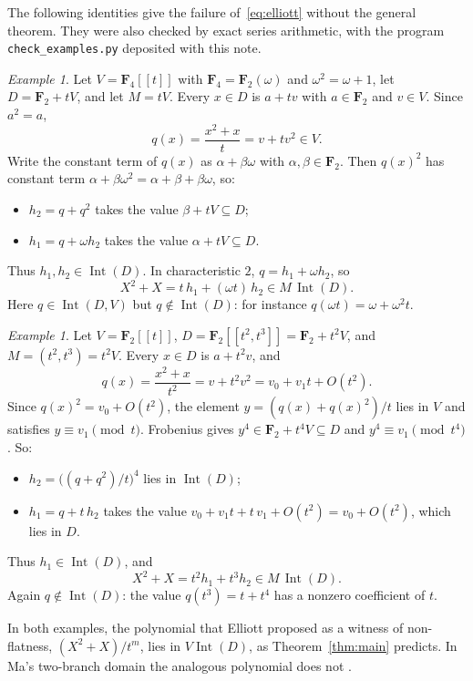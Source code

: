 \documentclass[11pt,a4paper]{article}
\theoremstyle{plain}
\theoremstyle{remark}
\newtheorem{example}[theorem]{Example}
\newcommand{\F}{\mathbf F}
\newcommand{\Int}{\operatorname{Int}}
\begin{document}
The following identities give the failure of~\eqref{eq:elliott} without the general theorem. They were also checked
by exact series arithmetic, with the program \texttt{check\_examples.py} deposited with this note.

\begin{example}\label{ex:f4}
Let $V=\F_4[[t]]$ with $\F_4=\F_2(\omega)$ and $\omega^2=\omega+1$, let $D=\F_2+tV$, and let $M=tV$. Every $x\in D$
is $a+tv$ with $a\in\F_2$ and $v\in V$. Since $a^2=a$,
\[
 q(x)=\frac{x^2+x}{t}=v+tv^2\in V .
\]
Write the constant term of $q(x)$ as $\alpha+\beta\omega$ with $\alpha,\beta\in\F_2$. Then $q(x)^2$ has constant term
$\alpha+\beta\omega^2=\alpha+\beta+\beta\omega$, so:
\begin{itemize}
\item $h_2=q+q^2$ takes the value $\beta+tV\subseteq D$;
\item $h_1=q+\omega h_2$ takes the value $\alpha+tV\subseteq D$.
\end{itemize}
Thus $h_1,h_2\in\Int(D)$. In characteristic $2$, $q=h_1+\omega h_2$, so
\[
 X^2+X=t\,h_1+(\omega t)\,h_2\in M\,\Int(D).
\]
Here $q\in\Int(D,V)$ but $q\notin\Int(D)$: for instance $q(\omega t)=\omega+\omega^2t$.
\end{example}

\begin{example}\label{ex:cusp}
Let $V=\F_2[[t]]$, $D=\F_2[[t^2,t^3]]=\F_2+t^2V$, and $M=(t^2,t^3)=t^2V$. Every $x\in D$ is $a+t^2v$, and
\[
 q(x)=\frac{x^2+x}{t^2}=v+t^2v^2=v_0+v_1t+O(t^2).
\]
Since $q(x)^2=v_0+O(t^2)$, the element $y=(q(x)+q(x)^2)/t$ lies in $V$ and satisfies $y\equiv v_1\pmod t$. Frobenius
gives $y^4\in\F_2+t^4V\subseteq D$ and $y^4\equiv v_1\pmod{t^4}$. So:
\begin{itemize}
\item $h_2=\bigl((q+q^2)/t\bigr)^4$ lies in $\Int(D)$;
\item $h_1=q+t\,h_2$ takes the value $v_0+v_1t+t\,v_1+O(t^2)=v_0+O(t^2)$, which lies in $D$.
\end{itemize}
Thus $h_1\in\Int(D)$, and
\[
 X^2+X=t^2h_1+t^3h_2\in M\,\Int(D).
\]
Again $q\notin\Int(D)$: the value $q(t^3)=t+t^4$ has a nonzero coefficient of $t$.
\end{example}

In both examples, the polynomial that Elliott proposed as a witness of non-flatness, $(X^2+X)/t^m$, lies in
$V\Int(D)$, as Theorem~\ref{thm:main} predicts. In Ma's two-branch domain the analogous polynomial does not
\cite[Proposition~4.1]{Ma}.
\end{document}
